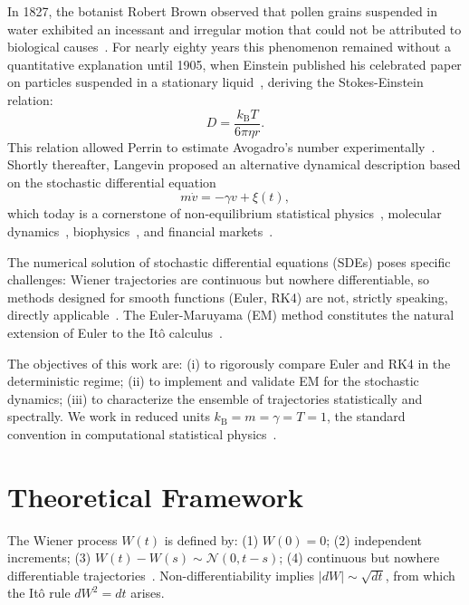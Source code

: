 \documentclass[aps,prl,twocolumn,showpacs,superscriptaddress,longbibliography]{revtex4-2}
\newcommand{\kB}{k_{\mathrm{B}}}
\begin{document}
In 1827, the botanist Robert Brown observed that pollen grains
suspended in water exhibited an incessant and irregular motion that
could not be attributed to biological causes~\cite{Brown1828}.
For nearly eighty years this phenomenon remained without a quantitative
explanation until 1905, when Einstein published his celebrated paper on
particles suspended in a stationary liquid~\cite{Einstein1905},
deriving the Stokes-Einstein relation:
\begin{equation}
	D = \frac{\kB T}{6\pi\eta r}.
	\label{eq:stokes_einstein}
\end{equation}
This relation allowed Perrin to estimate Avogadro's number
experimentally~\cite{Perrin1909}.  Shortly thereafter, Langevin proposed
an alternative dynamical description based on the stochastic differential
equation~\cite{Langevin1908}
\begin{equation}
	m\dot{v} = -\gamma v + \xi(t),
	\label{eq:langevin_intro}
\end{equation}
which today is a cornerstone of non-equilibrium statistical
physics~\cite{Zwanzig2001}, molecular dynamics~\cite{Allen1987},
biophysics~\cite{Doi1988}, and financial markets~\cite{Mantegna1999}.

The numerical solution of stochastic differential equations (SDEs)
poses specific challenges: Wiener trajectories are continuous but
nowhere differentiable, so methods designed for smooth functions
(Euler, RK4) are not, strictly speaking, directly
applicable~\cite{Kloeden1992}.  The Euler-Maruyama (EM) method
constitutes the natural extension of Euler to the Itô
calculus~\cite{Maruyama1955}.

The objectives of this work are: (i) to rigorously compare Euler and
RK4 in the deterministic regime; (ii) to implement and validate EM for
the stochastic dynamics; (iii) to characterize the ensemble of
trajectories statistically and spectrally.  We work in reduced units
$\kB{=}m{=}\gamma{=}T{=}1$, the standard convention in computational
statistical physics~\cite{Allen1987}.

\section{Theoretical Framework}
\label{sec:teoria}

The Wiener process $W(t)$ is defined by:
(1) $W(0)=0$;
(2) independent increments;
(3) $W(t)-W(s)\sim\mathcal{N}(0,t-s)$;
(4) continuous but nowhere differentiable trajectories~\cite{Gardiner2009}.
Non-differentiability implies $|dW|\sim\sqrt{dt}$, from which the
Itô rule $dW^2 = dt$ arises.
\end{document}

